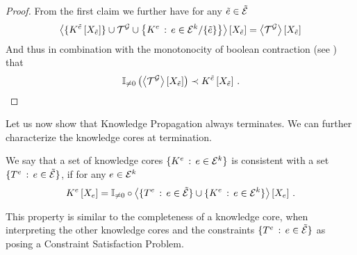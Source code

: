 \begin{proof}
    From the first claim we further have for any $\tilde{e}\in\tilde{\mathcal{E}}$
    \begin{align*}
        \left\langle \{K^{\tilde{e}}\left[X_{\tilde{e}}\right]\}\cup\mathcal{T}^{\mathcal{G}} \cup \left\{K^{e} \, : \, e\in\mathcal{E}^{k}/\{\tilde{e}\}\right\}\right\rangle \left[ X_{\tilde{e}} \right]
        = \left\langle \mathcal{T}^{\mathcal{G}}\right\rangle \left[ X_{\tilde{e}} \right]
    \end{align*}
    And thus in combination with the monotonocity of boolean contraction (see ) that
    \begin{align*}
        \mathbb{I}_{\neq0}\left(\left\langle \mathcal{T}^{\mathcal{G}}\right\rangle \left[ X_{\tilde{e}} \right]\right) \prec K^{\tilde{e}}\left[X_{\tilde{e}}\right]  \, .
    \end{align*}
\end{proof}


Let us now show that Knowledge Propagation always terminates.
We can further characterize the knowledge cores at termination.

\begin{definition}
    We say that a set of knowledge cores $\{K^{e} \, : \, e\in\mathcal{E}^{k}\}$ is consistent with a set $\{T^{e} \, : \, e\in\tilde{\mathcal{E}}\}$, if for any $e\in\mathcal{E}^{k}$
    \begin{align*}
        K^{e}\left[X_{e}\right]
        = \mathbb{I}_{\neq0}\circ\left\langle \{T^{e} \, : \, e\in\tilde{\mathcal{E}}\} \cup \{K^{e} \, : \, e\in\mathcal{E}^{k}\}\right\rangle \left[ X_{e} \right] \, .
    \end{align*}
\end{definition}

This property is similar to the completeness of a knowledge core, when interpreting the other knowledge cores and the constraints $\{T^{e} \, : \, e\in\tilde{\mathcal{E}}\}$ as posing a Constraint Satisfaction Problem.

